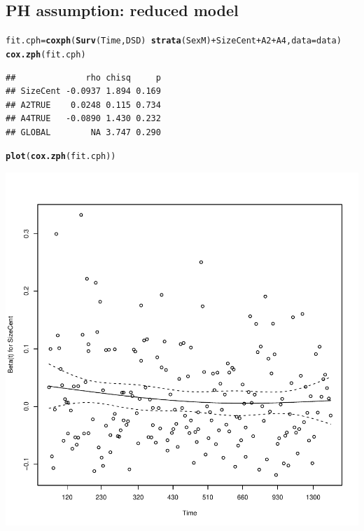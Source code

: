 \documentclass{article}\usepackage[]{graphicx}\usepackage[]{color}
\makeatletter
\def\maxwidth{ %
  \ifdim\Gin@nat@width>\linewidth
    \linewidth
  \else
    \Gin@nat@width
  \fi
}
\newcommand{\hlopt}[1]{\textcolor[rgb]{0,0,0}{#1}}%
\newcommand{\hlstd}[1]{\textcolor[rgb]{0.345,0.345,0.345}{#1}}%
\newcommand{\hlkwb}[1]{\textcolor[rgb]{0.69,0.353,0.396}{#1}}%
\newcommand{\hlkwc}[1]{\textcolor[rgb]{0.333,0.667,0.333}{#1}}%
\newcommand{\hlkwd}[1]{\textcolor[rgb]{0.737,0.353,0.396}{\textbf{#1}}}%
\newenvironment{kframe}{%
 \def\at@end@of@kframe{}%
 \ifinner\ifhmode%
  \def\at@end@of@kframe{\end{minipage}}%
  \begin{minipage}{\columnwidth}%
 \fi\fi%
 \def\FrameCommand##1{\hskip\@totalleftmargin \hskip-\fboxsep
 \colorbox{shadecolor}{##1}\hskip-\fboxsep
     \hskip-\linewidth \hskip-\@totalleftmargin \hskip\columnwidth}%
 \MakeFramed {\advance\hsize-\width
   \@totalleftmargin\z@ \linewidth\hsize
   \@setminipage}}%
 {\par\unskip\endMakeFramed%
 \at@end@of@kframe}
\newenvironment{knitrout}{}{} %
\makeatother
\begin{document}
\subsection{PH assumption: reduced model}
\begin{knitrout}
\color{fgcolor}\begin{kframe}
\begin{alltt}
\hlstd{fit.cph} \hlkwb{=} \hlkwd{coxph}\hlstd{(}\hlkwd{Surv}\hlstd{(Time, DSD)} \hlopt{~} \hlkwd{strata}\hlstd{(SexM)} \hlopt{+} \hlstd{SizeCent} \hlopt{+} \hlstd{A2} \hlopt{+} \hlstd{A4,} \hlkwc{data} \hlstd{= data)}
\hlkwd{cox.zph}\hlstd{(fit.cph)}
\end{alltt}
\begin{verbatim}
##              rho chisq     p
## SizeCent -0.0937 1.894 0.169
## A2TRUE    0.0248 0.115 0.734
## A4TRUE   -0.0890 1.430 0.232
## GLOBAL        NA 3.747 0.290
\end{verbatim}
\begin{alltt}
\hlkwd{plot}\hlstd{(}\hlkwd{cox.zph}\hlstd{(fit.cph))}
\end{alltt}
\end{kframe}

{\centering \includegraphics[width=\maxwidth]{figure/eda-ph-check-reduced-1} 

}





\end{knitrout}
\end{document}
